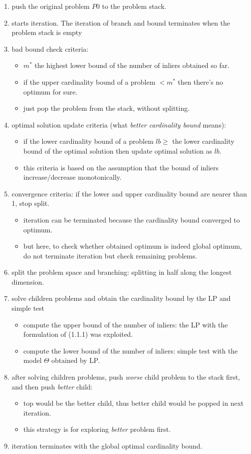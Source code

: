 \documentclass[paper=a4, fontsize=11pt]{scrartcl} %
\numberwithin{equation}{section} %
\numberwithin{figure}{section} %
\numberwithin{table}{section} %
\begin{document}
\begin{enumerate}
\item push the original problem $P0$ to the problem stack.
\item starts iteration. The iteration of branch and bound terminates when the problem stack is empty
\item bad bound check criteria: 
	\begin{itemize}
	\item $m^*$ the highest lower bound of the number of inliers obtained so far.
	\item if the upper cardinality bound of a problem $< m^*$ then there's no optimum for sure.
	\item just pop the problem from the stack, without splitting.
	\end{itemize}
\item optimal solution update criteria (what \textit{better cardinality bound} means):
	\begin{itemize}
	\item if the lower cardinality bound of a problem $lb \geq$ the lower cardinality bound of the optimal solution then update optimal solution as $lb$.  
	\item this criteria is based on the assumption that the bound of inliers increase/decrease monotonically.
	\end{itemize}
\item convergence criteria: if the lower and upper cardinality bound are nearer than 1, stop split. 
	\begin{itemize}
	\item iteration can be terminated because the cardinality bound converged to optimum. 
	\item but here, to check whether obtained optimum is indeed global optimum, do not terminate iteration but check remaining problems. 
	\end{itemize}
\item split the problem space and branching: splitting in half along the longest dimension. 
\item solve children problems and obtain the cardinality bound by the LP and simple test
	\begin{itemize}
	\item compute the upper bound of the number of inliers: the LP with the formulation of (1.1.1) was exploited.
	\item compute the lower bound of the number of inliers: simple test with the model $\Theta$ obtained by LP.
	\end{itemize}
\item after solving children problems, push \textit{worse} child problem to the stack first, and then push \textit{better} child:
	\begin{itemize}
	\item top would be the better child, thus better child would be popped in next iteration. 
	\item this strategy is for exploring \textit{better} problem first. 
	\end{itemize}
\item iteration terminates with the global optimal cardinality bound. 
\end{enumerate}
\end{document}
